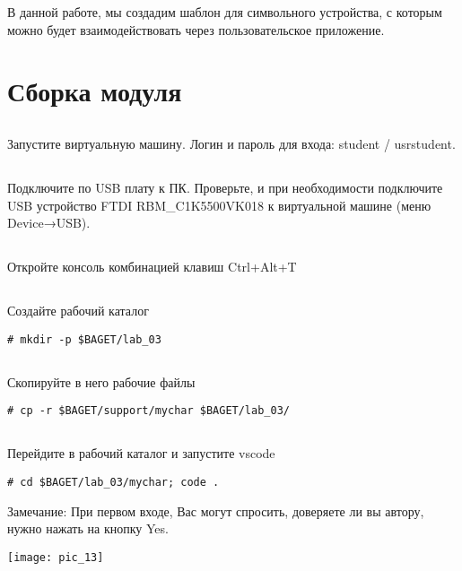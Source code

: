 В данной работе, мы создадим шаблон для символьного устройства, с которым можно будет взаимодействовать через пользовательское приложение.

\section{Сборка модуля}

\subsection{}Запустите виртуальную машину. Логин и пароль для входа: student / usrstudent.

\subsection{}Подключите по USB плату к ПК. Проверьте, и при необходимости подключите USB устройство FTDI RBM\_C1K5500VK018 к виртуальной машине (меню Device→USB).

\subsection{}Откройте консоль комбинацией клавиш Ctrl+Alt+T

\subsection{}Создайте рабочий каталог
\begin{lstlisting}[style=bash]
# mkdir -p $BAGET/lab_03 
\end{lstlisting}

\subsection{}Скопируйте в него рабочие файлы
\begin{lstlisting}[style=bash]
# cp -r $BAGET/support/mychar $BAGET/lab_03/
\end{lstlisting}

\subsection{}Перейдите в рабочий каталог и запустите vscode
\begin{lstlisting}[style=bash]
# cd $BAGET/lab_03/mychar; code .
\end{lstlisting}

\begin{Notes}{Замечание:} 
	При первом входе, Вас могут спросить, доверяете ли вы автору, нужно нажать на кнопку Yes.
	\begin{center}
		\texttt{[image: pic\_13]}
	\end{center}  
\end{Notes}

